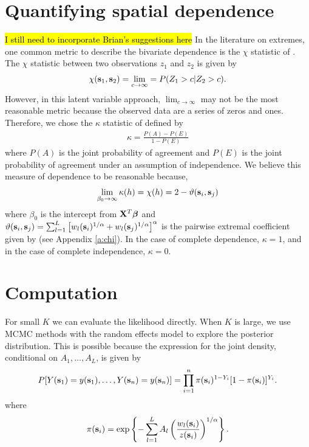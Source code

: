 \section{Quantifying spatial dependence}
\hl{I still need to incorporate Brian's suggestions here}
In the literature on extremes, one common metric to describe the bivariate dependence is the $\chi$ statistic of \citet{Coles1999}.
The $\chi$ statistic between two observations $z_1$ and $z_2$ is given by
\begin{align}
  \chi(\mathbf{s}_1, \mathbf{s}_2) = \lim_{c \rightarrow \infty} = P(Z_1 > c | Z_2 > c).
\end{align}
However, in this latent variable approach, $\lim_{c \rightarrow \infty}$ may not be the most reasonable metric because the observed data are a series of zeros and ones.
Therefore, we chose the $\kappa$ statistic of \citet{Cohen1960} defined by
\begin{align}
  \kappa = \frac{P(A) - P(E)}{1 - P(E)}
\end{align}
where $P(A)$ is the joint probability of agreement and $P(E)$ is the joint probability of agreement under an assumption of independence.
We believe this measure of dependence to be reasonable because,
\begin{align}
  \lim_{\beta_0 \rightarrow \infty} \kappa(h) = \chi(h) = 2 - \vartheta(\mathbf{s}_i, \mathbf{s}_j)
\end{align}
where $\beta_0$ is the intercept from $\mathbf{X}^T\mbox{\boldmath $\beta$}$ and $\vartheta (\mathbf{s}_i, \mathbf{s}_j) = \sum_{ l = 1 }^{ L } \left[ w_{l}(\mathbf{s}_i)^{ 1/\alpha } +  w_{ l}(\mathbf{s}_j)^{ 1/\alpha } \right]^\alpha$ is the pairwise extremal coefficient given by \citet{Reich2012} (see Appendix \ref{a:chi}).
In the case of complete dependence, $\kappa = 1$, and in the case of complete independence, $\kappa = 0$.

\section{Computation}\label{s:comp}
For small $K$ we can evaluate the likelihood directly.
When $K$ is large, we use MCMC methods with the random effects model to explore the posterior distribution.
This is possible because the expression for the joint density, conditional on $A_1, \ldots, A_L$, is given by
\begin{align}
  P[Y(\mathbf{s}_1)=y(\mathbf{s}_1),\ldots,Y(\mathbf{s}_n)=y(\mathbf{s}_n)] = \prod_{ i = 1 }^{ n } \pi(\mathbf{s}_i)^{ 1 - Y_i } [1 - \pi(\mathbf{s}_i)]^{ Y_i }.
\end{align}
where
\begin{align}
  \pi(\mathbf{s}_i) = \exp \left\{ -\sum_{ l = 1 }^{L} A_l \left( \frac{ w_{l}(\mathbf{s}_i) }{ z(\mathbf{s}_i) } \right)^{ 1/\alpha} \right\}.
\end{align}

